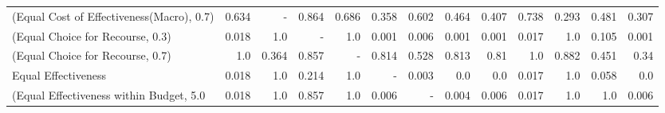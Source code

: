 \documentclass{article}
\begin{document}
\begin{table}[ht]
{\begin{tabular}{lrrrrrrrrrrrr}
(Equal Cost of Effectiveness(Macro), 0.7)          &                                     0.634 &                                         - &                            0.864 &                            0.686 &               0.358 &                                              0.602 &                                     0.464 &                                     0.407 &                                     0.738 &                                     0.293 &                            0.481 &                                      0.307 \\
(Equal Choice for Recourse, 0.3)                   &                                     0.018 &                                       1.0 &                                - &                              1.0 &               0.001 &                                              0.006 &                                     0.001 &                                     0.001 &                                     0.017 &                                       1.0 &                            0.105 &                                      0.001 \\
(Equal Choice for Recourse, 0.7)                   &                                       1.0 &                                     0.364 &                            0.857 &                                - &               0.814 &                                              0.528 &                                     0.813 &                                      0.81 &                                       1.0 &                                     0.882 &                            0.451 &                                       0.34 \\
Equal Effectiveness                                &                                     0.018 &                                       1.0 &                            0.214 &                              1.0 &                   - &                                              0.003 &                                       0.0 &                                       0.0 &                                     0.017 &                                       1.0 &                            0.058 &                                        0.0 \\
(Equal Effectiveness within Budget, 5.0 &                                     0.018 &                                       1.0 &                            0.857 &                              1.0 &               0.006 &                                                  - &                                     0.004 &                                     0.006 &                                     0.017 &                                       1.0 &                              1.0 &                                      0.006 \\

\end{tabular}}
\end{table}
\end{document}
